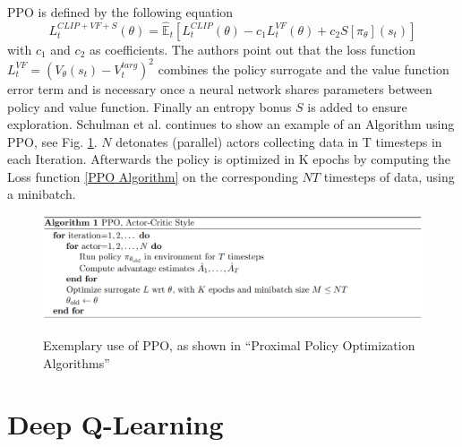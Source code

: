 PPO is defined by the following equation
\begin{equation}\label{PPO Algorithm}
    L_{t}^{CLIP+VF+S}(\theta) = \hat{\mathbb{E}}_{t}[L_{t}^{CLIP}(\theta) - c_{1}L_{t}^{VF}(\theta) + c_{2}S[\pi_{\theta}](s_{t})]
\end{equation}
with $c_{1}$ and $c_{2}$ as coefficients. The authors point out that the loss function \\
$L_{t}^{VF} = (V_{\theta}(s_{t})-V_{t}^{targ})^2$
combines the policy surrogate and the value function error term and is
necessary once a neural network shares parameters between policy and value function.
Finally an entropy bonus $S$ is added to ensure exploration.
Schulman et al. continues to show an example of an Algorithm using PPO, see Fig. \ref{fig:ppo_algo_code}.
$N$ detonates (parallel) actors collecting data in T timesteps in each Iteration.
Afterwards the policy is optimized in K epochs by computing the Loss function \eqref{PPO Algorithm} on the
corresponding $NT$ timesteps of data, using a minibatch.
\begin{figure}[hpbt]
    \centering
    \includegraphics[width=1\textwidth]{pictures/ppo_algo_code.png}\\
    \caption[Exemplary use of PPO]{Exemplary use of PPO, as shown in ``Proximal Policy Optimization Algorithms''\cite{scwo17}}\label{fig:ppo_algo_code}
\end{figure}

\section{Deep Q-Learning}